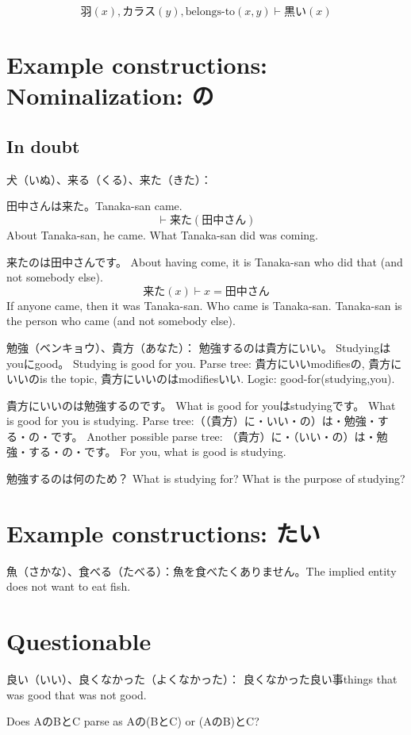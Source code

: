 \[
    羽(x), カラス(y), \text{belongs-to}(x,y) \vdash 黒い(x)
\]

\section{Example constructions: Nominalization: の}

\subsection{In doubt}

犬（いぬ）、来る（くる）、来た（きた）：

田中さんは来た。Tanaka-san came.
\[
    \vdash 来た(田中さん)
\]
About Tanaka-san, he came.
What Tanaka-san did was coming.

来たのは田中さんです。
About having come,
it is Tanaka-san who did that (and not somebody else).
\[
    来た(x) \vdash x = 田中さん
\]
If anyone came, then it was Tanaka-san.
Who came is Tanaka-san.
Tanaka-san is the person who came (and not somebody else).

勉強（ベンキョウ）、貴方（あなた）：
勉強するのは貴方にいい。
Studyingはyouにgood。
Studying is good for you.
Parse tree:
貴方にいいmodifiesの,
貴方にいいのis the topic,
貴方にいいのはmodifiesいい.
Logic: good-for(studying,you).

貴方にいいのは勉強するのです。
What is good for youはstudyingです。
What is good for you is studying.
Parse tree:（（貴方）に・いい・の）は・勉強・する・の・です。
Another possible parse tree:
（貴方）に・（いい・の）は・勉強・する・の・です。
For you, what is good is studying.

勉強するのは何のため？
What is studying for?
What is the purpose of studying?

\section{Example constructions: たい}

魚（さかな）、食べる（たべる）：魚を食べたくありません。The implied entity does not want to eat fish.

\section{Questionable}

良い（いい）、良くなかった（よくなかった）：
良くなかった良い事things that was good that was not good.

Does AのBとC parse as Aの(BとC) or (AのB)とC?
